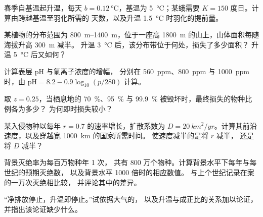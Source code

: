 \begin{exercise}[$\star\star$]\label{exo:b2:global-change:6}
春季自基温起升温，每天 $b = \qty{0.12}{\celsius}$，基温为
\qty{5}{\celsius}；某蛾需要 $K = 150$ 度日。计算由跨越基温至羽化所需的
天数，以及升温
\qty{1.5}{\celsius} 时羽化的提前量。
\end{exercise}

\begin{exercise}[$\star\star$]\label{exo:b2:global-change:7}
某植物的分布范围为 \qtyrange{800}{1400}{m}，位于一座高
\qty{1800}{m} 的山上，山体面积每随海拔升高 \qty{300}{m} 减半。
升温 \qty{3}{\celsius} 后，该分布带位于何处，损失了多少面积？
升温 \qty{5}{\celsius} 后又如何？
\end{exercise}

\begin{exercise}[$\star\star$]\label{exo:b2:global-change:8}
计算表层 pH 与氢离子浓度的增幅，
分别在 \qty{560}{ppm}、\qty{800}{ppm} 与 \qty{1000}{ppm} 时，由 $\mathrm{pH} = 8.2 -
0.9\log_{10}(p/280)$ 计算。
\end{exercise}

\begin{exercise}[$\star\star$]\label{exo:b2:global-change:9}
取 $z = 0.25$，当栖息地的
\qty{70}{\%}、\qty{95}{\%} 与 \qty{99.9}{\%} 被毁坏时，最终损失的物种比例各为多少？
为何即时损失较小？
\end{exercise}

\begin{exercise}[$\star\star\star$]\label{exo:b2:global-change:10}
某入侵物种以每年 $r = 0.7$ 的速率增长，扩散系数为 $D =
\qty{20}{km^2/yr}$。计算其前沿速度，以及穿越宽 \qty{1000}{km} 的国家所需时间。
使速度减半的是将 $r$ 减半，
还是将 $D$ 减半？
\end{exercise}

\begin{exercise}[$\star\star\star$]\label{exo:b2:global-change:11}
背景灭绝率为每百万物种年 1 次，
共有 800 万个物种。计算背景水平下每年与每世纪的预期灭绝数，
以及背景水平 1000 倍时的相应数值。
与上个世纪记录在案的一万次灭绝相比较，
并评论其中的差异。
\end{exercise}

\begin{exercise}[$\star\star\star$]\label{exo:b2:global-change:12}
“净排放停止，升温即停止。”试依据大气的，
以及升温与成正比的关系加以论证，
并指出该论证缺少什么。
\end{exercise}

